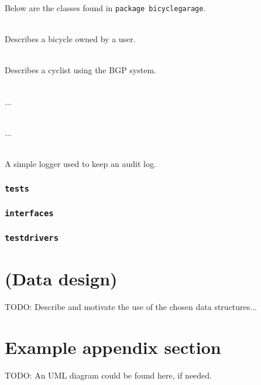 \documentclass[12pt,titlepage]{article}
\begin{document}
Below are the classes found in \texttt{package bicyclegarage}.

\begin{description}[font=\normalfont]
	\item [\texttt{Bicycle}]	\hfill \\
		Describes a bicycle owned by a user.

	\item [\texttt{User}]		\hfill \\
		Describes a cyclist using the BGP system.

	\item [\texttt{Garage}]		\hfill \\
		...

	\item [\texttt{Manager}]	\hfill \\
		...

	\item [\texttt{Logger}]		\hfill \\
		A simple logger used to keep an audit log.
\end{description}


\subsubsection{\texttt{tests}}
\subsubsection{\texttt{interfaces}}
\subsubsection{\texttt{testdrivers}}

\section{(Data design)}
\label{sec:data-design}

TODO: Describe and motivate the use of the chosen data structures...



\newpage
\appendix

\section{Example appendix section}
\label{app:example-appendix-section}

TODO: An UML diagram could be found here, if needed.
\end{document}
